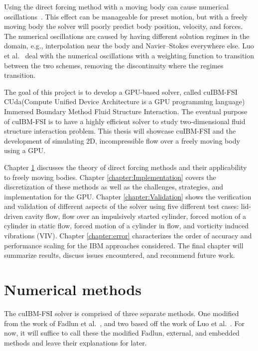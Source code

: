 Using the direct forcing method with a moving body can cause numerical oscillations~\cite{liao2010simulating,Luo:2012gx}.
This effect can be manageable for preset motion, but with a freely moving body the solver will poorly predict body position, velocity, and forces. 
The numerical oscillations are caused by having different solution regimes in the domain, e.g., interpolation near the body and Navier--Stokes everywhere else. 
Luo et al.~\cite{Luo:2012gx} deal with the numerical oscillations with a weighting function to transition between the two schemes, removing the discontinuity where the regimes transition. 

The goal of this project is to develop a GPU-based solver, called cuIBM-FSI CUda(Compute Unified Device Architecture is a GPU programming language) Immersed Boundary Method Fluid Structure Interaction. 
The eventual purpose of cuIBM-FSI is to have a highly efficient solver to study two-dimensional fluid structure interaction problem. 
This thesis will showcase cuIBM-FSI and the development of simulating 2D, incompressible flow over a freely moving body using a GPU.

Chapter \ref{chapter:Numerical Methods} discusses the theory of direct forcing methods and their applicability to freely moving bodies. 
Chapter \ref{chapter:Implementation} covers the discretization of these methods as well as the challenges, strategies, and implementation for the GPU. 
Chapter \ref{chapter:Validation} shows the verification and validation of different aspects of the solver using five different test cases: lid-driven cavity flow, flow over an impulsively started cylinder, forced motion of a cylinder in static flow, forced motion of a cylinder in flow, and vorticity induced vibrations (VIV). 
Chapter \ref{chapter:error} characterizes the order of accuracy and performance scaling for the IBM approaches considered. 
The final chapter will summarize results, discuss issues encountered, and recommend future work.

\chapter{Numerical methods}\label{chapter:Numerical Methods}
The cuIBM-FSI solver is comprised of three separate methods. 
One modified from the work of Fadlun et al.~\cite{Fadlun:2000fl}, and two based off the work of Luo et al.~\cite{Luo:2012gx}. 
For now, it will suffice to call these the modified Fadlun, external, and embedded methods and leave their explanations for later. 

